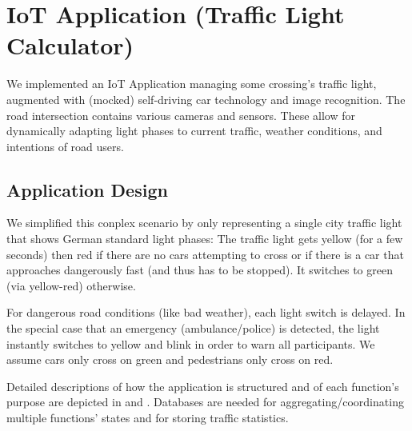 \documentclass[../main.tex]{subfiles}
\begin{document}
\section{IoT Application (Traffic Light Calculator)}\label{sec:iot}

We implemented an IoT Application managing some crossing's traffic light, 
augmented with (mocked) self-driving car technology and image recognition. 
The road intersection contains various cameras and sensors. 
These allow for dynamically adapting light phases to current traffic, 
weather conditions, and intentions of road users. 

\subsection{Application Design}\label{ssec:iotApplicationStructure}

We simplified this conplex scenario by only representing a single city traffic light 
that shows German standard light phases: 
The traffic light gets yellow (for a few seconds) then red if there are no cars attempting to cross 
or if there is a car that approaches dangerously fast (and thus has to be stopped). 
It switches to green (via yellow-red) otherwise. 

For dangerous road conditions (like bad weather), each light switch is delayed. 
In the special case that an emergency (ambulance/police) is detected, 
the light instantly switches to yellow and blink 
in order to warn all participants. 
We assume cars only cross on green and pedestrians only cross on red.

Detailed descriptions of how the application is structured 
and of each function's purpose are depicted in 
 and .
Databases are needed for aggregating/coordinating multiple functions' states
and for storing traffic statistics. 
\end{document}
